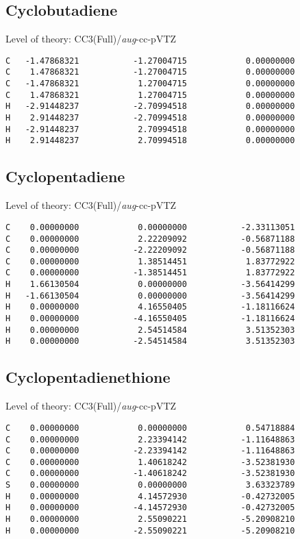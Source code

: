 \documentclass[journal=jctcce,manuscript=article,layout=traditional]{achemso}
\newcommand{\AVTZ}{\emph{aug}-cc-pVTZ}
\begin{document}
\subsection*{Cyclobutadiene}

\begin{singlespace}
Level of theory: CC3(Full)/{\AVTZ}
\begin{verbatim}
C   -1.47868321           -1.27004715            0.00000000
C    1.47868321           -1.27004715            0.00000000
C   -1.47868321            1.27004715            0.00000000
C    1.47868321            1.27004715            0.00000000
H   -2.91448237           -2.70994518            0.00000000
H    2.91448237           -2.70994518            0.00000000
H   -2.91448237            2.70994518            0.00000000
H    2.91448237            2.70994518            0.00000000
\end{verbatim}
\end{singlespace}

\subsection*{Cyclopentadiene}

\begin{singlespace}
Level of theory: CC3(Full)/{\AVTZ}
\begin{verbatim}
C    0.00000000            0.00000000           -2.33113051
C    0.00000000            2.22209092           -0.56871188
C    0.00000000           -2.22209092           -0.56871188
C    0.00000000            1.38514451            1.83772922
C    0.00000000           -1.38514451            1.83772922
H    1.66130504            0.00000000           -3.56414299
H   -1.66130504            0.00000000           -3.56414299
H    0.00000000            4.16550405           -1.18116624
H    0.00000000           -4.16550405           -1.18116624
H    0.00000000            2.54514584            3.51352303
H    0.00000000           -2.54514584            3.51352303
\end{verbatim}
\end{singlespace}

\subsection*{Cyclopentadienethione}

\begin{singlespace}
Level of theory: CC3(Full)/{\AVTZ}
\begin{verbatim}
C    0.00000000            0.00000000            0.54718884
C    0.00000000            2.23394142           -1.11648863
C    0.00000000           -2.23394142           -1.11648863
C    0.00000000            1.40618242           -3.52381930
C    0.00000000           -1.40618242           -3.52381930
S    0.00000000            0.00000000            3.63323789
H    0.00000000            4.14572930           -0.42732005 
H    0.00000000           -4.14572930           -0.42732005 
H    0.00000000            2.55090221           -5.20908210
H    0.00000000           -2.55090221           -5.20908210
\end{verbatim}
\end{singlespace}
\end{document}
